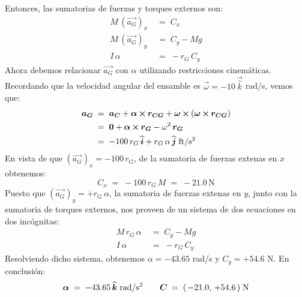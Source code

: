 \documentclass[ a4paper, twoside, 11pt]{article}
\begin{document}
\begin{problem}
Entonces, las sumatorias de fuerzas y torques externos son: 
\begin{align*}
M \, (\vec{a_G})_x \; & = \; C_x \\
M \, (\vec{a_G})_y \; & = \; C_y - M g \\
I \, \alpha \; & = \; -r_G \, C_y
\end{align*}
Ahora debemos relacionar $\vec{a_G}$ con $\alpha$ utilizando restricciones cinem\'aticas. Recordando que la velocidad angular del ensamble es $\vec{\omega} = -10 \, \vec{\hat{k}}$ rad/s, vemos que: 
\begin{align*}
{\boldsymbol{a_G}} \; & = \;
{\boldsymbol{a_C}} + {\boldsymbol{\alpha}} \,{\boldsymbol{\times}}\, {\boldsymbol{r_{CG}}} + 
{\boldsymbol{\omega}} \,{\boldsymbol{\times}}\, ( {\boldsymbol{\omega}} \,{\boldsymbol{\times}}\, {\boldsymbol{r_{CG}}} ) \\
\; & = \;
{\boldsymbol{0}} + {\boldsymbol{\alpha}} \,{\boldsymbol{\times}}\, {\boldsymbol{r_{G}}} - \omega^2 \, {\boldsymbol{r_G}} \\
\; & = \; -100 \, r_G \, {\boldsymbol{\widehat{i}}} + r_G \, \alpha \, {\boldsymbol{\widehat{j}}} \; \text{ft/s\ensuremath{^{\text{2}}}}
\end{align*}
En vista de que $(\vec{a_G})_x = -100 \, r_G$, de la sumatoria de fuerzas extenas en $x$ obtenemos: 
\[
C_x \; = \; -100 \, r_G \, M \; = \; -21.0 \, \text{N}
\]
Puesto que $(\vec{a_G})_y = +r_G \, \alpha$, la sumatoria de fuerzas extenas en $y$, junto con la sumatoria de torques externos, nos proveen de un sistema de dos ecuaciones en dos inc\'ognitas: 
\begin{align*}
M \, r_G \, \alpha \; & = \; C_y - M g \\
I \, \alpha \; & = \; -r_G \, C_y
\end{align*}
Resolviendo dicho sistema, obtenemos $\alpha = -43.65$ rad/s y $C_y = +54.6$ N. En conclusi\'on: 
\[
{\boldsymbol{\alpha}} \; = \; -43.65 \, {\boldsymbol{\widehat{k}}} \; \text{rad/s\ensuremath{^{\text{2}}}} \qquad
{\boldsymbol{C}} \; = \; ( \, -21.0, \, +54.6 \, ) \; \text{N}
\]


\end{problem}
\fullskip
\end{document}
